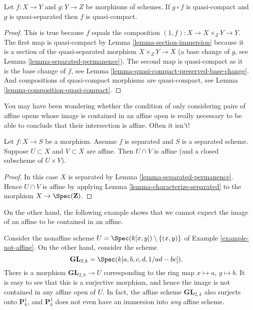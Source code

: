 \begin{lemma}
\label{lemma-quasi-compact-permanence}
Let $f : X \to Y$ and $g : Y \to Z$ be morphisms of schemes.
If $g \circ f$ is quasi-compact and $g$ is quasi-separated
then $f$ is quasi-compact.
\end{lemma}

\begin{proof}
This is true because $f$ equals the composition
$(1, f) : X \to X \times_Z Y \to Y$. The first map
is quasi-compact by Lemma \ref{lemma-section-immersion}
because it is a section of the quasi-separated morphism $X \times_Z Y \to X$
(a base change of $g$, see Lemma \ref{lemma-separated-permanence}).
The second map is quasi-compact as it
is the base change of $f$, see
Lemma \ref{lemma-quasi-compact-preserved-base-change}.
And compositions of quasi-compact
morphisms are quasi-compact, see Lemma \ref{lemma-composition-quasi-compact}.
\end{proof}

\noindent
You may have been wondering whether the condition
of only considering pairs of affine opens whose image is contained
in an affine open is really necessary to be able to conclude
that their intersection is affine. Often it isn't!

\begin{lemma}
\label{lemma-curiosity}
Let $f : X \to S$ be a morphism.
Assume $f$ is separated and $S$ is a separated scheme.
Suppose $U \subset X$ and $V \subset X$ are affine.
Then $U \cap V$ is affine (and a closed subscheme of $U \times V$).
\end{lemma}

\begin{proof}
In this case $X$ is separated by Lemma \ref{lemma-separated-permanence}.
Hence $U \cap V$ is affine by
applying Lemma \ref{lemma-characterize-separated} to the
morphism $X \to \Spec(\mathbf{Z})$.
\end{proof}

\noindent
On the other hand, the following example shows that we cannot
expect the image of an affine to be contained in an affine.

\begin{example}
\label{example-image-affine-projective}
Consider the nonaffine scheme
$U = \Spec(k[x, y]) \setminus \{(x, y)\}$ of
Example \ref{example-not-affine}. On the other hand, consider the
scheme
$$
\mathbf{GL}_{2, k} = \Spec(k[a, b, c, d, 1/ad - bc]).
$$
There is a morphism $\mathbf{GL}_{2, k} \to U$ corresponding
to the ring map $x \mapsto a$, $y \mapsto b$. It is easy to see that
this is a surjective morphism, and hence the image is not contained
in any affine open of $U$. In fact, the affine scheme
$\mathbf{GL}_{2, k}$ also surjects onto $\mathbf{P}^1_k$, and
$\mathbf{P}^1_k$ does not even have an immersion into {\it any} affine scheme.
\end{example}

